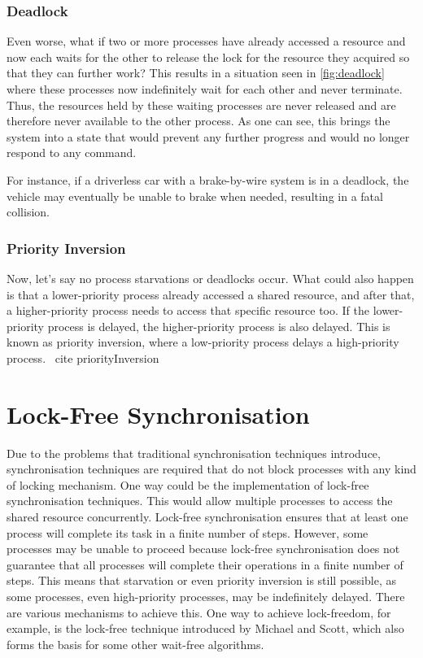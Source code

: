 \subsubsection{Deadlock}\label{subsubsec:deadlock}

Even worse, what if two or more processes have already accessed a resource and now each waits for the other to release the lock for the resource they acquired so that they can further work? This results in a situation seen in \cref{fig:deadlock} where these processes now indefinitely wait for each other and never terminate. Thus, the resources held by these waiting processes are never released and are therefore never available to the other process. As one can see, this brings the system into a state that would prevent any further progress and would no longer respond to any command. \cite{chahar2013deadlock}

For instance, if a driverless car with a brake-by-wire system is in a deadlock, the vehicle may eventually be unable to brake when needed, resulting in a fatal collision. 


\subsubsection{Priority Inversion}\label{subsubsec:priority-inversion}

Now, let's say no process starvations or deadlocks occur. What could also happen is that a lower-priority process already accessed a shared resource, and after that, a higher-priority process needs to access that specific resource too. If the lower-priority process is delayed, the higher-priority process is also delayed. This is known as priority inversion, where a low-priority process delays a high-priority process. \ cite {priorityInversion} \cite{priorityInversion}

\section{Lock-Free Synchronisation}\label{sec:lock-free}

Due to the problems that traditional synchronisation techniques introduce, synchronisation techniques are required that do not block processes with any kind of locking mechanism. One way could be the implementation of lock-free synchronisation techniques. This would allow multiple processes to access the shared resource concurrently. Lock-free synchronisation ensures that at least one process will complete its task in a finite number of steps. However, some processes may be unable to proceed because lock-free synchronisation does not guarantee that all processes will complete their operations in a finite number of steps. This means that starvation or even priority inversion is still possible, as some processes, even high-priority processes, may be indefinitely delayed. There are various mechanisms to achieve this. One way to achieve lock-freedom, for example, is the lock-free technique introduced by Michael and Scott, which also forms the basis for some other wait-free algorithms.

